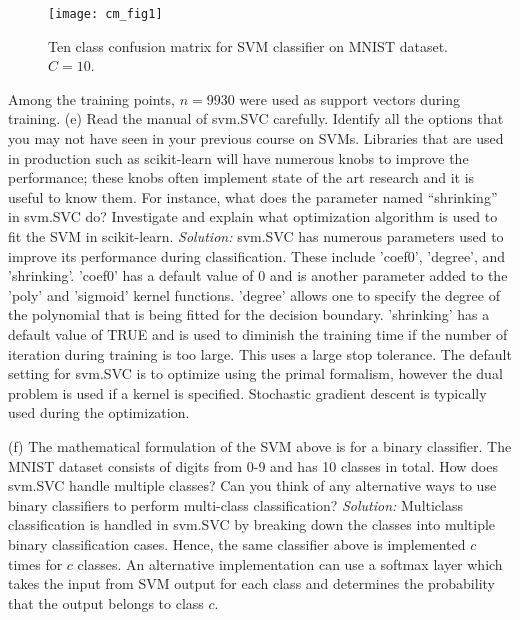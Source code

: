 \documentclass[12pt]{article}
\begin{document}
\begin{figure}[H]
\centering
\texttt{[image: cm\_fig1]}
\caption{Ten class confusion matrix for SVM classifier on MNIST dataset. $C=10$.}\label{visina8}
\end{figure}
Among the training points, $n=9930$ were used as support vectors during training.  \newline   \newline 
(e) Read the manual of svm.SVC carefully. Identify all the options that you may not have
seen in your previous course on SVMs. Libraries that are used in production such as scikit-learn
will have numerous knobs to improve the performance; these knobs often implement state of the art
research and it is useful to know them. For instance, what does the parameter named “shrinking”
in svm.SVC do? Investigate and explain what optimization algorithm is used to fit the SVM in
scikit-learn. \newline \newline 
\emph{Solution:} \newline 
svm.SVC  has numerous parameters used to improve its performance during classification.  These include 'coef0', 'degree',  and 'shrinking'. 'coef0'  has a default value of 0 and is another parameter added to the 'poly' and 'sigmoid' kernel functions. 'degree' allows one to specify the degree of the polynomial that is being fitted for the decision boundary. 'shrinking' has a default value of TRUE and is  used to diminish the training time if the number of iteration during training is too large. This uses a large stop tolerance. The default setting for svm.SVC is to optimize using the primal formalism, however the dual problem is used if a kernel is specified.  Stochastic gradient descent is typically used during the optimization.  \newline   \newline  


(f) The mathematical formulation of the SVM above is for a binary classifier. The MNIST
dataset consists of digits from 0-9 and has 10 classes in total. How does svm.SVC handle multiple
classes? Can you think of any alternative ways to use binary classifiers to perform multi-class
classification?\newline \newline 
\emph{Solution:} \newline  
Multiclass classification is handled in svm.SVC by breaking down the classes into multiple binary classification cases. Hence, the same classifier above is implemented $c$ times for $c$ classes. An alternative implementation can use a softmax layer which takes the input from SVM output for each class and determines the probability that the output belongs to class $c$.  \newline  \newline 
\end{document}
